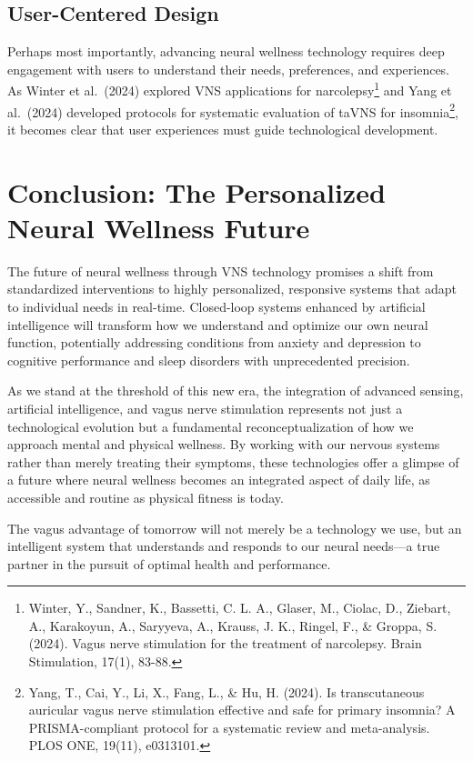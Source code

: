 \documentclass[
  Letterpaper,
]{scrbook}
\begin{document}
\subsection{User-Centered Design}\label{user-centered-design}

Perhaps most importantly, advancing neural wellness technology requires
deep engagement with users to understand their needs, preferences, and
experiences. As Winter et al.~(2024) explored VNS applications for
narcolepsy\footnote{Winter, Y., Sandner, K., Bassetti, C. L. A., Glaser,
  M., Ciolac, D., Ziebart, A., Karakoyun, A., Saryyeva, A., Krauss, J.
  K., Ringel, F., \& Groppa, S. (2024). Vagus nerve stimulation for the
  treatment of narcolepsy. Brain Stimulation, 17(1), 83-88.} and Yang et
al.~(2024) developed protocols for systematic evaluation of taVNS for
insomnia\footnote{Yang, T., Cai, Y., Li, X., Fang, L., \& Hu, H. (2024).
  Is transcutaneous auricular vagus nerve stimulation effective and safe
  for primary insomnia? A PRISMA-compliant protocol for a systematic
  review and meta-analysis. PLOS ONE, 19(11), e0313101.}, it becomes
clear that user experiences must guide technological development.

\section{Conclusion: The Personalized Neural Wellness
Future}\label{conclusion-the-personalized-neural-wellness-future}

The future of neural wellness through VNS technology promises a shift
from standardized interventions to highly personalized, responsive
systems that adapt to individual needs in real-time. Closed-loop systems
enhanced by artificial intelligence will transform how we understand and
optimize our own neural function, potentially addressing conditions from
anxiety and depression to cognitive performance and sleep disorders with
unprecedented precision.

As we stand at the threshold of this new era, the integration of
advanced sensing, artificial intelligence, and vagus nerve stimulation
represents not just a technological evolution but a fundamental
reconceptualization of how we approach mental and physical wellness. By
working with our nervous systems rather than merely treating their
symptoms, these technologies offer a glimpse of a future where neural
wellness becomes an integrated aspect of daily life, as accessible and
routine as physical fitness is today.

The vagus advantage of tomorrow will not merely be a technology we use,
but an intelligent system that understands and responds to our neural
needs---a true partner in the pursuit of optimal health and performance.
\end{document}
